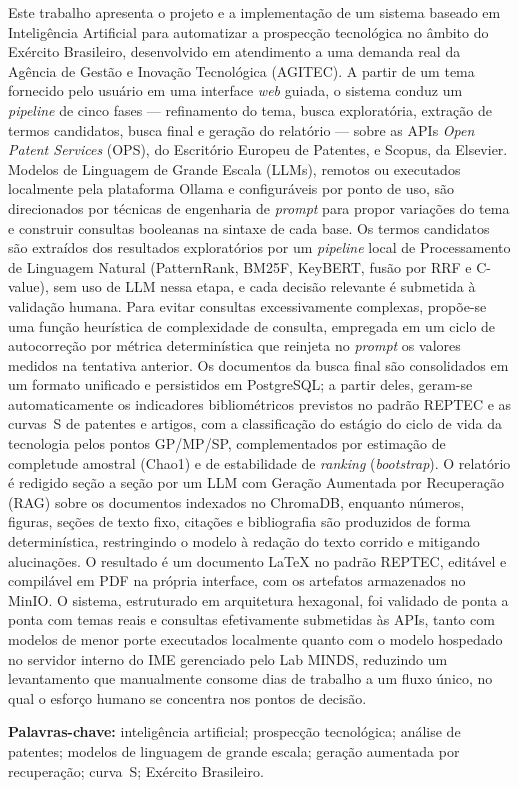 \documentclass[12pt, a4paper]{article}
\begin{document}
\begin{singlespace}
\noindent
Este trabalho apresenta o projeto e a implementação de um sistema baseado em
Inteligência Artificial para automatizar a prospecção tecnológica no âmbito do
Exército Brasileiro, desenvolvido em atendimento a uma demanda real da Agência
de Gestão e Inovação Tecnológica (AGITEC). A partir de um tema fornecido pelo
usuário em uma interface \textit{web} guiada, o sistema conduz um
\textit{pipeline} de cinco fases --- refinamento do tema, busca exploratória,
extração de termos candidatos, busca final e geração do relatório --- sobre as APIs
\textit{Open Patent Services} (OPS), do Escritório Europeu de Patentes, e
Scopus, da Elsevier. Modelos de Linguagem de Grande Escala (LLMs), remotos ou
executados localmente pela plataforma Ollama e configuráveis por ponto de uso,
são direcionados por técnicas de engenharia de \textit{prompt} para propor
variações do tema e construir consultas booleanas na sintaxe de cada base. Os
termos candidatos são extraídos dos resultados exploratórios por um
\textit{pipeline} local de Processamento de Linguagem Natural (PatternRank,
BM25F, KeyBERT, fusão por RRF e C-value), sem uso de LLM nessa etapa, e cada
decisão relevante é submetida à validação humana. Para evitar consultas
excessivamente complexas, propõe-se uma função heurística de complexidade de
consulta, empregada em um ciclo de autocorreção por métrica determinística que
reinjeta no \textit{prompt} os valores medidos na tentativa anterior. Os
documentos da busca final são consolidados em um formato unificado e
persistidos em PostgreSQL; a partir deles, geram-se automaticamente os
indicadores bibliométricos previstos no padrão REPTEC e as curvas~S de patentes
e artigos, com a classificação do estágio do ciclo de vida da tecnologia pelos
pontos GP/MP/SP, complementados por estimação de completude amostral (Chao1) e
de estabilidade de \textit{ranking} (\textit{bootstrap}). O relatório é redigido
seção a seção por um LLM com Geração Aumentada por Recuperação (RAG) sobre os
documentos indexados no ChromaDB, enquanto números, figuras, seções de texto
fixo, citações e bibliografia são produzidos de forma determinística, restringindo
o modelo à redação do texto corrido e mitigando alucinações. O resultado é um
documento LaTeX no padrão REPTEC, editável e compilável em PDF na própria
interface, com os artefatos armazenados no MinIO. O sistema, estruturado em
arquitetura hexagonal, foi validado de ponta a ponta com temas reais e consultas
efetivamente submetidas às APIs, tanto com modelos de menor porte executados
localmente quanto com o modelo hospedado no servidor interno do IME gerenciado pelo
Lab MINDS, reduzindo um levantamento que manualmente consome dias de trabalho a um fluxo
único, no qual o esforço humano se concentra nos pontos de decisão.

\vspace{0.6cm}

\noindent
\textbf{Palavras-chave:} inteligência artificial; prospecção tecnológica;
análise de patentes; modelos de linguagem de grande escala; geração aumentada
por recuperação; curva~S; Exército Brasileiro.
\end{singlespace}
\end{document}
